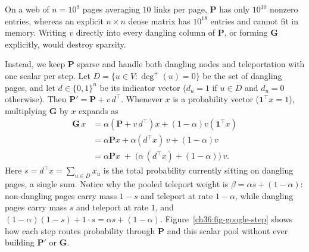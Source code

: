 On a web of $n = 10^9$ pages averaging $10$ links per page, $\mathbf{P}$ has only $10^{10}$ nonzero entries, whereas an explicit $n \times n$ dense matrix has $10^{18}$ entries and cannot fit in memory. Writing $v$ directly into every dangling column of $\mathbf{P}$, or forming $\mathbf{G}$ explicitly, would destroy sparsity.

Instead, we keep $\mathbf{P}$ sparse and handle both dangling nodes and teleportation with one scalar per step. Let $D = \{u \in V : \deg^+(u) = 0\}$ be the set of dangling pages, and let $d \in \{0,1\}^n$ be its indicator vector ($d_u = 1$ if $u \in D$ and $d_u = 0$ otherwise). Then $\mathbf{P}' = \mathbf{P} + v\, d^\top$. Whenever $x$ is a probability vector ($\mathbf{1}^\top x = 1$), multiplying $\mathbf{G}$ by $x$ expands as
\begin{align*}
  \mathbf{G}\,x
  &= \alpha(\mathbf{P} + v\,d^\top)x + (1-\alpha)v(\mathbf{1}^\top x) \\
  &= \alpha\mathbf{P}x + \alpha(d^\top x)\,v + (1-\alpha)v \\
  &= \alpha\mathbf{P}x \;+\; \big(\alpha\,(d^\top x) + (1-\alpha)\big)\,v.
\end{align*}
Here $s = d^\top x = \sum_{u \in D} x_u$ is the total probability currently sitting on dangling pages, a single sum. Notice why the pooled teleport weight is $\beta = \alpha s + (1-\alpha)$: non-dangling pages carry mass $1 - s$ and teleport at rate $1 - \alpha$, while dangling pages carry mass $s$ and teleport at rate $1$, and $(1-\alpha)(1-s) + 1 \cdot s = \alpha s + (1-\alpha)$. Figure~\ref{ch36:fig-google-step} shows how each step routes probability through $\mathbf{P}$ and this scalar pool without ever building $\mathbf{P}'$ or $\mathbf{G}$.

